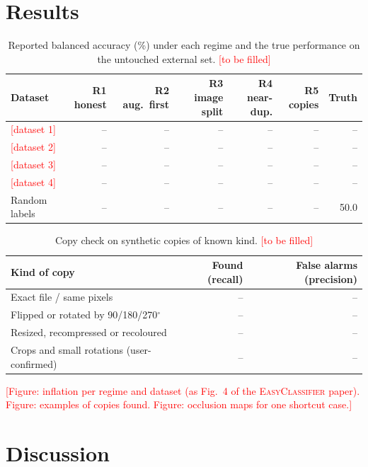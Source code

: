 \documentclass[11pt,a4paper]{article}
\newcommand{\EC}{\textsc{EasyClassifier}}
\newcommand{\TBD}[1]{\textcolor{red}{[#1]}}
\begin{document}
\section{Results}
\label{sec:results}

\begin{table}[t]
\centering\small
\caption{Reported balanced accuracy (\%) under each regime and the true performance on the untouched external set. \TBD{to be filled}}
\label{tab:results}
\begin{tabular}{@{}lrrrrrr@{}}
\toprule
Dataset & R1 honest & R2 aug.\ first & R3 image split & R4 near-dup. & R5 copies & Truth \\
\midrule
\TBD{dataset 1} & -- & -- & -- & -- & -- & -- \\
\TBD{dataset 2} & -- & -- & -- & -- & -- & -- \\
\TBD{dataset 3} & -- & -- & -- & -- & -- & -- \\
\TBD{dataset 4} & -- & -- & -- & -- & -- & -- \\
\midrule
Random labels & -- & -- & -- & -- & -- & 50.0 \\
\bottomrule
\end{tabular}
\end{table}

\begin{table}[t]
\centering\small
\caption{Copy check on synthetic copies of known kind. \TBD{to be filled}}
\label{tab:copycheck}
\begin{tabular}{@{}lrr@{}}
\toprule
Kind of copy & Found (recall) & False alarms (precision) \\
\midrule
Exact file / same pixels & -- & -- \\
Flipped or rotated by 90/180/270$^\circ$ & -- & -- \\
Resized, recompressed or recoloured & -- & -- \\
Crops and small rotations (user-confirmed) & -- & -- \\
\bottomrule
\end{tabular}
\end{table}

\TBD{Figure: inflation per regime and dataset (as Fig.~4 of the \EC{} paper). Figure: examples of copies found. Figure: occlusion maps for one shortcut case.}

\section{Discussion}
\label{sec:discussion}
\end{document}
